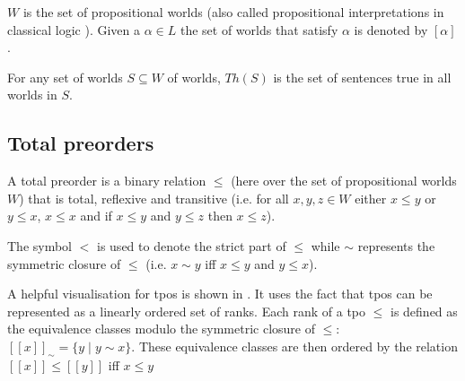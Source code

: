 \documentclass[11pt]{scrartcl}
\theoremstyle{definition}
\begin{document}
$W$ is the set of propositional worlds (also called propositional interpretations in classical logic \cite{Kai2020}). Given a $\alpha \in L$ the set of worlds that satisfy $\alpha$ is denoted by $[\alpha]$.

For any set of worlds $S \subseteq W$ of worlds, $Th(S)$ is the set of sentences true in all worlds in $S$.

\subsection{Total preorders}
A total preorder is a binary relation $\leq$ (here over the set of propositional worlds $W$) that is total, reflexive and transitive (i.e. for all $x, y, z \in W$ either $x \leq y$ or $y \leq x$, $x \leq x$ and if $x \leq y$ and $y \leq z$ then $x \leq z$).

The symbol $<$ is used to denote the strict part of $\leq$ while $\sim$ represents the symmetric closure of $\leq$ (i.e. $x \sim y$ iff $x \leq y$ and $y \leq x$).

A helpful visualisation for tpos is shown in \cite{Booth2006}. It uses the fact that tpos can be represented as a linearly ordered set of ranks. Each rank of a tpo $\leq$ is defined as the equivalence classes modulo the symmetric closure of $\leq$: $[[x]]_{\sim} = \{y \mid y \sim x\}$. These equivalence classes are then ordered by the relation $[[x]] \leq [[y]]$ iff $x \leq y$
\end{document}

